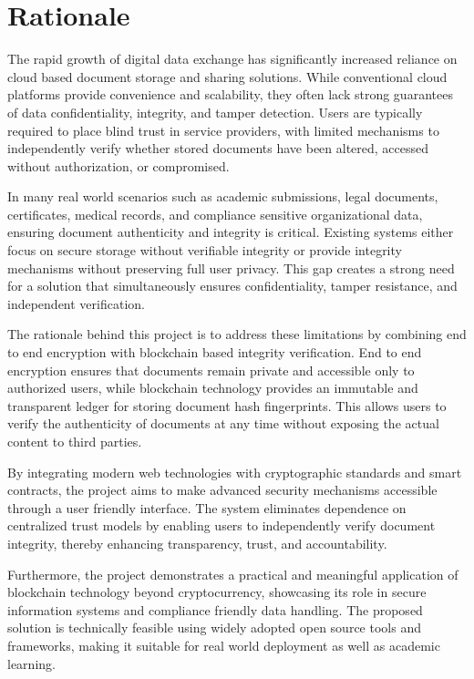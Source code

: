 \documentclass[12pt]{article}
\begin{document}
\newpage
\section{Rationale}

The rapid growth of digital data exchange has significantly increased reliance on cloud based document storage and sharing solutions. While conventional cloud platforms provide convenience and scalability, they often lack strong guarantees of data confidentiality, integrity, and tamper detection. Users are typically required to place blind trust in service providers, with limited mechanisms to independently verify whether stored documents have been altered, accessed without authorization, or compromised.

In many real world scenarios such as academic submissions, legal documents, certificates, medical records, and compliance sensitive organizational data, ensuring document authenticity and integrity is critical. Existing systems either focus on secure storage without verifiable integrity or provide integrity mechanisms without preserving full user privacy. This gap creates a strong need for a solution that simultaneously ensures confidentiality, tamper resistance, and independent verification.

The rationale behind this project is to address these limitations by combining end to end encryption with blockchain based integrity verification. End to end encryption ensures that documents remain private and accessible only to authorized users, while blockchain technology provides an immutable and transparent ledger for storing document hash fingerprints.\cite{nist197} This allows users to verify the authenticity of documents at any time without exposing the actual content to third parties.

By integrating modern web technologies with cryptographic standards and smart contracts, the project aims to make advanced security mechanisms accessible through a user friendly interface. The system eliminates dependence on centralized trust models by enabling users to independently verify document integrity, thereby enhancing transparency, trust, and accountability.

Furthermore, the project demonstrates a practical and meaningful application of blockchain technology beyond cryptocurrency, showcasing its role in secure information systems and compliance friendly data handling.\cite{szabo1997} The proposed solution is technically feasible using widely adopted open source tools and frameworks, making it suitable for real world deployment as well as academic learning.
\end{document}
